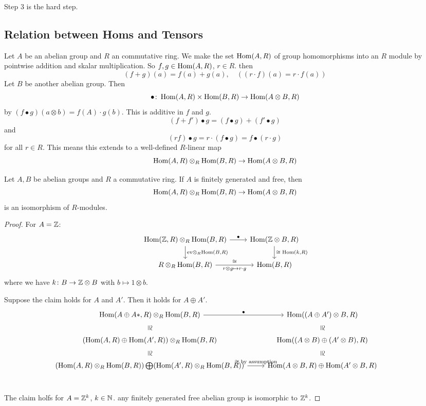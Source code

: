 \documentclass[language=english]{TemplateLecture}
\begin{document}
Step 3 is the hard step.

\subsection{Relation between Homs and Tensors}

Let \(A\) be an abelian group and \(R\) an commutative ring. We make the set \(\operatorname{Hom}(A,R)\) of group homomorphisms into an \(R\) module by pointwise addition and skalar multiplication. So \(f,g \in \operatorname{Hom}(A,R)\), \(r \in R\). then
\[(f+g)(a) = f(a) + g(a), \quad ((r\cdot f)(a) = r\cdot f(a))\]
Let \(B\) be another abelian group. Then
\[\bullet \colon \operatorname{Hom}(A,R) \times \operatorname{Hom}(B,R) \to \operatorname{Hom}(A\otimes B, R)\]
by \((f\bullet g)(a\otimes b) = f(A) \cdot g(b)\). This is additive in \(f\) and \(g\).
\[(f+f') \bullet g = (f\bullet g) + (f' \bullet g)\]
and
\[(rf) \bullet g = r \cdot (f\bullet g) = f \bullet (r\cdot g)\]
for all \(r \in R\).
This means this extends to a well-defined \(R\)-linear map
\[\operatorname{Hom}(A,R) \otimes_R \operatorname{Hom}(B,R) \to \operatorname{Hom}(A\otimes B, R)\]
\begin{proposition}
    Let \(A,B\) be abelian groups and \(R\) a commutative ring. If \(A\) is finitely generated and free, then
    \[\operatorname{Hom}(A, R) \otimes_R \operatorname{Hom}(B,R) \to \operatorname{Hom}(A\otimes B, R)\]
    is an isomorphism of \(R\)-modules.
\end{proposition}

\begin{proof}
    For \(A = \mathbb{Z}\):
    \[\begin{tikzcd}
        {\Hom(\IZ,R) \otimes_R \Hom(B,R)} \ar[r, "\bullet"] \ar[d, "{\mathrm{ev} \otimes_R \Hom(B,R)}"] & {\Hom(\IZ\otimes B, R)} \ar[d, "{\cong \; \Hom(k,R)}"]\\
        {R \otimes_R \Hom(B,R)} \ar[r, "\cong", "r\otimes g \mapsto r\cdot g"'] & {\Hom(B,R)}
    \end{tikzcd}\]
    where we have \(k \colon B \to \mathbb{Z} \otimes B\) with \(b\mapsto 1 \otimes b\).

    Suppose the claim holds for \(A\) and \(A'\). Then it holds for \(A \oplus A'\).
    \[\begin{tikzcd}
        {\Hom(A\oplus A*, R) \otimes_R \Hom(B,R)} \ar[r, "\bullet"] \ar[d, phantom, sloped, "\cong"]& {\Hom((A\oplus A') \otimes B, R)} \ar[d, phantom, sloped, "\cong"] \\
        {(\Hom(A,R) \oplus \Hom(A',R)) \otimes_R \Hom(B,R)} \ar[d, phantom, sloped, "\cong"] & {\Hom((A\otimes B) \oplus (A' \otimes B), R)} \ar[d, phantom, sloped, "\cong"]\\
        {(\Hom(A,R) \otimes_R \Hom(B,R)) \bigoplus (\Hom(A',R) \otimes_R \Hom(B,R))} \ar[r, "\cong \; \text{by assumption}"]&  {\Hom(A\otimes B, R) \oplus \Hom(A' \otimes B, R)} &\\
    \end{tikzcd}\]

    The claim holfs for \(A = \mathbb{Z}^k\), \(k \in \mathbb{N}\). any finitely generated free abelian group is isomorphic to \(\mathbb{Z}^k\).
\end{proof}
\end{document}
